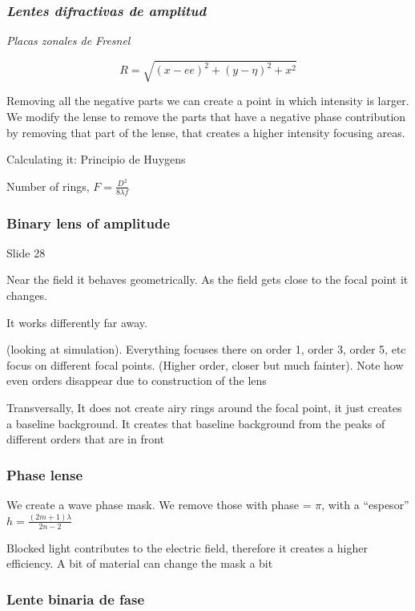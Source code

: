 \documentclass[../main/main.tex]{subfiles}
\begin{document}
\subsubsection{\emph{Lentes difractivas de amplitud}}

\emph{Placas zonales de Fresnel}

\begin{equation}
R = \sqrt{(x-ee)^{2} + (y-\eta)^{2} + x^{2}}
\end{equation}

Removing all the negative parts we can create a point in which intensity is larger. We modify the lense to remove the parts that have a negative phase contribution by removing that part of the lense, that creates a higher intensity focusing areas.

Calculating it: Principio de Huygens 

Number of rings, $F= \frac{D^{2}}{8 \lambda f}$

\subsubsection*{Binary lens of amplitude}

Slide 28

Near the field it behaves geometrically. As the field gets close to the focal point it changes.

It works differently far away. 

(looking at simulation). Everything focuses there on order 1, order 3, order 5, etc focus on different focal points.  (Higher order, closer but much fainter). Note how even orders disappear due to construction of the lens

Transversally, It does not create airy rings around the focal point, it just creates a baseline background. It creates that baseline background from the peaks of different orders that are in front 

\subsubsection*{Phase lense}

We create a wave phase mask. We remove those with phase = $\pi$, with a ``espesor''$h =\frac{(2m + 1)\lambda}{2n -2}$

Blocked light contributes to the electric field, therefore it creates a higher efficiency. A bit of material can change the mask a bit

\subsubsection*{Lente binaria de fase}
\end{document}
